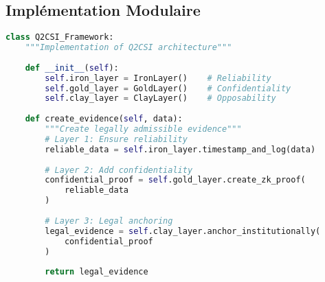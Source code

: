 \subsection{Implémentation Modulaire}
\begin{lstlisting}[language=Python, caption=Implementation of Q2CSI architecture]
class Q2CSI_Framework:
    """Implementation of Q2CSI architecture"""
    
    def __init__(self):
        self.iron_layer = IronLayer()    # Reliability
        self.gold_layer = GoldLayer()    # Confidentiality
        self.clay_layer = ClayLayer()    # Opposability
    
    def create_evidence(self, data):
        """Create legally admissible evidence"""
        # Layer 1: Ensure reliability
        reliable_data = self.iron_layer.timestamp_and_log(data)
        
        # Layer 2: Add confidentiality
        confidential_proof = self.gold_layer.create_zk_proof(
            reliable_data
        )
        
        # Layer 3: Legal anchoring
        legal_evidence = self.clay_layer.anchor_institutionally(
            confidential_proof
        )
        
        return legal_evidence
\end{lstlisting}